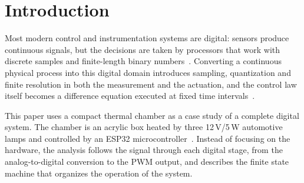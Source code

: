 \section{Introduction}

Most modern control and instrumentation systems are digital: sensors produce continuous signals,
but the decisions are taken by processors that work with discrete samples and finite-length
binary numbers~\cite{tocci2011}. Converting a continuous physical process into this digital domain
introduces sampling, quantization and finite resolution in both the measurement and the actuation,
and the control law itself becomes a difference equation executed at fixed time
intervals~\cite{franklin1998,oppenheim2010}.

This paper uses a compact thermal chamber as a case study of a complete digital system. The chamber
is an acrylic box heated by three 12\,V/5\,W automotive lamps and controlled by an ESP32
microcontroller~\cite{esp32ds}. Instead of focusing on the hardware, the analysis follows the
signal through each digital stage, from the analog-to-digital conversion to the PWM output, and
describes the finite state machine that organizes the operation of the system.
